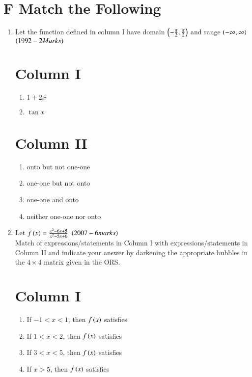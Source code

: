\documentclass[journal,12pt,onecolumn,article]{IEEEtran}
\theoremstyle{remark}
\begin{document}
	\section*{F Match the Following}
	\begin{enumerate}
		\item Let the function defined in column I have domain $\left(-\frac{\pi}{2},\frac{\pi}{2}\right)$ and range $\left(-\infty,\infty\right)$ \hfill${\left(1992-2 Marks\right)}$
			\begin{multicols}{2} 
				\section*{Column I}
				\begin{enumerate}[label=(\Alph*)]
					\item $1+2x$
					\item $\tan x$
				\end{enumerate}
				\columnbreak
				 \section*{Column II}
				\begin{enumerate}[label=(\alph*),start=16]
					\item onto but not one-one
					\item one-one but not onto
					\item one-one and onto
					\item neither one-one nor onto
				\end{enumerate}
			\end{multicols}
		\item Let $f\left(x\right)=\frac{x^2-6x+5}{x^2-5x+6}$ \hfill{$\left(2007-6 marks\right)$}
					\\ Match of expressions/statements in Column I with expressions/statements in Column II and indicate your answer by darkening the appropriate bubbles in the $4\times4$ matrix given in the ORS.
	
			              \begin{multicols}{2}
					      \section*{ Column I}
						\begin{enumerate}[label=(\Alph*)]
							\item If $-1<x<1$, then $f\left(x\right)$ satisfies
							\item If $1<x<2$, then $f\left(x\right)$ satisfies
							\item If $3<x<5$, then $f\left(x\right)$ satisfies
 							\item If $x>5$, then $f\left(x\right)$ satisfies
						\end{enumerate}
						\columnbreak

\end{multicols}
\end{enumerate}
\end{document}
